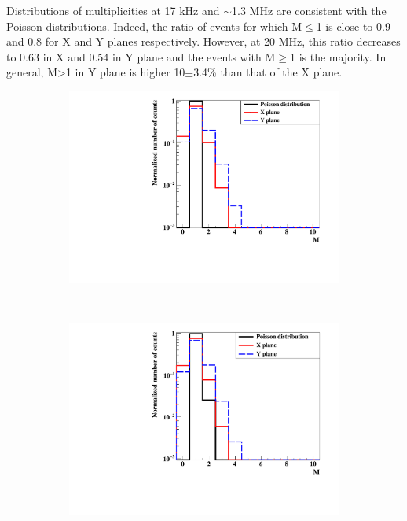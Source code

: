 \documentclass[a4paper,11pt]{article}
\begin{document}
Distributions of multiplicities at 17 kHz and $\sim$1.3 MHz are consistent with the Poisson distributions. Indeed, the ratio of events for which M$\leq$1 is close to 0.9 and 0.8 for X and Y planes respectively. However, at 20 MHz, this ratio decreases to 0.63 in X and 0.54 in Y plane and the events with M$\geq$1 is the majority. In general, M>1 in Y plane is higher 10$\pm$3.4\% than that of the X plane.
\begin{figure}[H]
\centering
    \begin{subfigure}{0.3\textwidth} \centering \includegraphics[width=\textwidth]{figures/Involved_fibers_17kHz_without_X=0.pdf} \caption{} \label{fig:Fibers_17kHz}
    \end{subfigure}
    ~
    \begin{subfigure}{0.3\textwidth} \centering \includegraphics[width=\textwidth]{figures/Involved_fibers_1MHz_without_X=0.pdf} \caption{} \label{fig:Fibers_1MHz}

\end{subfigure}
\end{figure}
\end{document}
